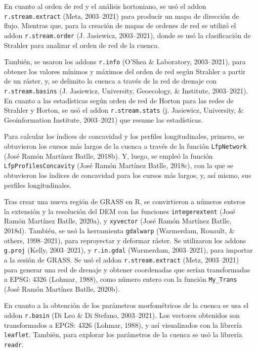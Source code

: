 \documentclass[11pt,]{article}
\begin{document}
En cuanto al orden de red y el análisis hortoniano, se usó el addon
\texttt{r.stream.extract} (Metz, 2003--2021) para producir un mapa de
dirección de flujo. Mientras que, para la creación de mapas de ordenes
de red se utilizó el addon \texttt{r.stream.order} (J. Jasiewicz,
2003--2021), donde se usó la clasificación de Strahler para analizar el
orden de red de la cuenca.

También, se usaron los addons \texttt{r.info} (O'Shea \& Laboratory,
2003--2021), para obtener los valores mínimos y máximos del orden de red
según Strahler a partir de un ráster, y, se delimito la cuenca a través
de la red de drenaje con \texttt{r.stream.basins} (J. Jasiewicz,
University, Geoecology, \& Institute, 2003--2021). En cuanto a las
estadísticas según orden de red de Horton para las redes de Strahler y
Horton, se usó el addon \texttt{r.stream.stats} (j. Jasiewicz,
University, \& Geoinformation Institute, 2003--2021) que resume las
estadísticas.

Para calcular los índices de concavidad y los perfiles longitudinales,
primero, se obtuvieron los cursos más largos de la cuenca a través de la
función \texttt{LfpNetwork} (José Ramón Martínez Batlle, 2018b). Y,
luego, se empleó la función \texttt{LfpProfilesConcavity} (José Ramón
Martínez Batlle, 2018c), con la que se obtuvieron los índices de
concavidad para los cursos más largos, y, así mismo, sus perfiles
longitudinales.

Tras crear una nueva región de GRASS en R, se convirtieron a números
enteros la extensión y la resolución del DEM con las funciones
\texttt{integerextent} (José Ramón Martínez Batlle, 2020a), y
\texttt{xyvector} (José Ramón Martínez Batlle, 2018d). También, se usó
la herramienta \texttt{gdalwarp} (Warmerdam, Rouault, \& others,
1998--2021), para reproyectar y deformar ráster. Se utilizaron los
addons \texttt{g.proj} (Kelly, 2003--2021), y \texttt{r.in.gdal}
(Warmerdam, 2003--2021), para importar a la sesión de GRASS. Se usó el
addon \texttt{r.stream.extract} (Metz, 2003--2021) para generar una red
de drenaje y obtener coordenadas que serían transformadas a EPSG: 4326
(Lohmar, 1988), como número entero con la función \texttt{My\_Trans}
(José Ramón Martínez Batlle, 2020b).

En cuanto a la obtención de los parámetros morfométricos de la cuenca se
usa el addon \texttt{r.basin} (Di Leo \& Di Stefano, 2003--2021). Los
vectores obtenidos son transformados a EPGS: 4326 (Lohmar, 1988), y así
visualizados con la librería \texttt{leaflet}. También, para explorar
los parámetros de la cuenca se usó la librería \texttt{readr}.
\end{document}
